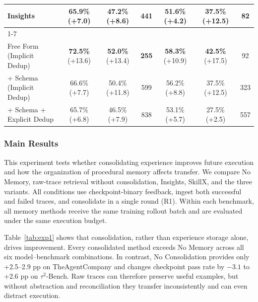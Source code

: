 \begin{table}[tb]
{\begin{tabular}{l ccc ccc}
Insights           & 65.9\% {\scriptsize(+7.0)}      & 47.2\% {\scriptsize(+8.6)}      & 441     & 51.6\% {\scriptsize(+4.2)}      & 37.5\% {\scriptsize(+12.5)}     & \textbf{82}  \\
\cmidrule(lr){1-7}
\multicolumn{7}{l}{\textit{WASP-Mem}} \\
\rowcolor{OurRow}
\quad Free Form (Implicit Dedup)             & \textbf{72.5\%} {\scriptsize(+13.6)} & \textbf{52.0\%} {\scriptsize(+13.4)} & \textbf{255} & \textbf{58.3\%} {\scriptsize(+10.9)} & \textbf{42.5\%} {\scriptsize(+17.5)} & 92           \\
\quad + Schema (Implicit Dedup)              & 66.6\% {\scriptsize(+7.7)}     & 50.4\% {\scriptsize(+11.8)}     & 599          & 56.2\% {\scriptsize(+8.8)}      & 37.5\% {\scriptsize(+12.5)}     & 323          \\
\quad + Schema + Explicit Dedup              & 65.7\% {\scriptsize(+6.8)}     & 46.5\% {\scriptsize(+7.9)}      & 838          & 53.1\% {\scriptsize(+5.7)}      & 27.5\% {\scriptsize(+2.5)}      & 557          \\
\bottomrule
\end{tabular}}
\end{table}

\subsubsection{Main Results}
\label{sec:exp1-main-results}

This experiment tests whether consolidating experience improves future execution
and how the organization of procedural memory affects transfer. We compare No
Memory, raw-trace retrieval without consolidation, Insights, SkillX, and the
three \method{} variants. All conditions use checkpoint-binary feedback,
ingest both successful and failed traces, and consolidate in a single round
(R1). Within each benchmark, all memory methods receive the same training
rollout batch and are evaluated under the same execution budget.


Table~\ref{tab:exp1} shows that consolidation, rather than experience storage
alone, drives improvement. Every consolidated method exceeds No Memory across
all six model--benchmark combinations. In contrast, No Consolidation provides
only +2.5--2.9 pp on TheAgentCompany and changes checkpoint pass rate by
$-3.1$ to +2.6 pp on $\tau^2$-Bench. Raw traces can therefore preserve useful
examples, but without abstraction and reconciliation they transfer
inconsistently and can even distract execution.

